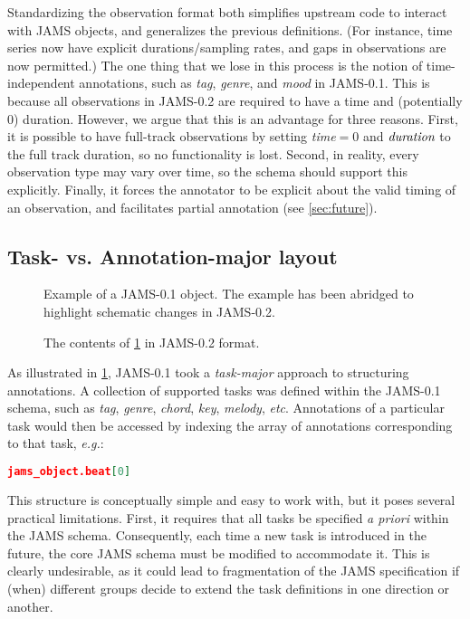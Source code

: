 \documentclass{article}
\begin{document}
Standardizing the observation format both simplifies upstream code to interact with JAMS objects, and generalizes the previous
definitions. (For instance, time series now have explicit durations/sampling rates, and gaps in observations are now permitted.)
The one thing that we lose in this process is the notion of time-independent annotations, such as \emph{tag}, \emph{genre}, and \emph{mood} 
in JAMS-0.1.
This is because all observations in JAMS-0.2 are required to have a time and (potentially 0) duration.
However, we argue that this is an advantage for three reasons.
First, it is possible to have full-track observations by setting \emph{time}$=0$ and $\emph{duration}$ to the full track duration, so no functionality is lost.
Second, in reality, every observation type may vary over time, so the schema should support this explicitly.
Finally, it forces the annotator to be explicit about the valid timing of an observation, and facilitates partial annotation (see \cref{sec:future}).

\subsection{Task- vs. Annotation-major layout}\label{sec:schema:task}

\begin{figure}
    \tiny
    
    \caption{Example of a JAMS-0.1 object.  The example has been abridged to highlight
        schematic changes in JAMS-0.2.\label{jams1}}
\end{figure}

\begin{figure}
    \tiny
    
    \caption{The contents of \cref{jams1} in JAMS-0.2 format.\label{jams2}}
\end{figure}

As illustrated in \cref{jams1}, JAMS-0.1 took a \emph{task-major} approach to structuring annotations.  A collection of supported tasks was
defined within the JAMS-0.1 schema, such as \emph{tag}, \emph{genre}, \emph{chord}, \emph{key}, \emph{melody}, \emph{etc}.  Annotations of a
particular task would then be accessed by indexing the array of annotations corresponding to that task, \emph{e.g.}:\\
\begin{lstlisting}[language=json]
  jams_object.beat[0]
\end{lstlisting}

This structure is conceptually simple and easy to work with, but it poses several practical limitations.
First, it requires that all tasks be specified \emph{a priori} within the JAMS schema.
Consequently, each time a new task is introduced in the future, the core JAMS schema must be modified to accommodate it.
This is clearly undesirable, as it could lead to fragmentation of the JAMS specification if (when) different groups decide to extend the task definitions in one direction or another.
\end{document}
